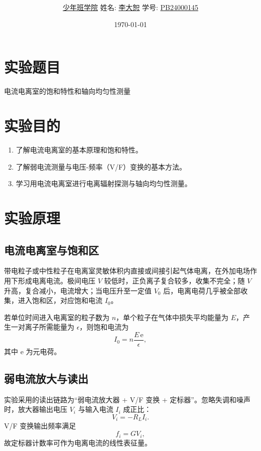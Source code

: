 \documentclass[12pt,a4paper]{article}
\title{\Huge{\textbf{\uuline{实\ 验\ 报\ 告}}}}
\author{\uline{少年班学院} \quad 姓名: \uline{李大恕} \quad 学号: \uline{PB24000145}}
\date{\today}
\begin{document}
\maketitle

\section{实验题目}
电流电离室的饱和特性和轴向均匀性测量

\section{实验目的}
\begin{enumerate}
    \item 了解电流电离室的基本原理和饱和特性。
    \item 了解弱电流测量与电压-频率（V/F）变换的基本方法。
    \item 学习用电流电离室进行电离辐射探测与轴向均匀性测量。
\end{enumerate}

\section{实验原理}
\subsection{电流电离室与饱和区}
带电粒子或中性粒子在电离室灵敏体积内直接或间接引起气体电离，在外加电场作用下形成电离电流。极间电压 $V$ 较低时，正负离子复合较多，收集不完全；随 $V$ 升高，复合减小，电流增大；当电压升至一定值 $V_0$ 后，电离电荷几乎被全部收集，进入饱和区，对应饱和电流 $I_0$。

若单位时间进入电离室的粒子数为 $n$，单个粒子在气体中损失平均能量为 $E$，产生一对离子所需能量为 $\epsilon$，则饱和电流为
\begin{equation}
    I_0 = n\frac{E\,\mathrm{e}}{\epsilon},
\end{equation}
其中 $\mathrm{e}$ 为元电荷。

\subsection{弱电流放大与读出}
实验采用的读出链路为“弱电流放大器 + V/F 变换 + 定标器”。忽略失调和噪声时，放大器输出电压 $V_i$ 与输入电流 $I_i$ 成正比：
\begin{equation}
    V_i = -R_L I_i.
\end{equation}
V/F 变换输出频率满足
\begin{equation}
    f_i = G V_i,
\end{equation}
故定标器计数率可作为电离电流的线性表征量。
\end{document}
